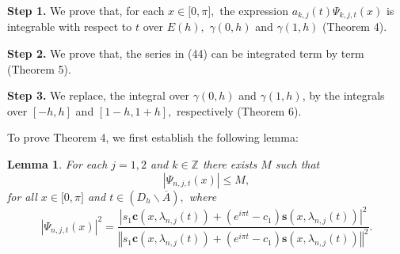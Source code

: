 \documentclass{article}%
\newtheorem{lemma}{Lemma}
{}
\begin{document}
\textbf{Step 1. }We prove that, for each $x\in\lbrack0,\pi],$ the expression
$a_{k,j}(t)\Psi_{k,j,t}(x)$ is integrable with respect to $t$ over $E(h),$
$\gamma(0,h)$ and $\gamma(1,h)$ (Theorem 4).

\textbf{Step 2. }We prove that, the series in (44) can be integrated term by
term (Theorem 5).

\textbf{Step 3. }We replace, the integral over $\gamma(0,h)$ and $\gamma
(1,h)$, by the integrals over $[-h,h]$ and $[1-h,1+h],$ respectively (Theorem 6).

To prove Theorem 4, we first establish the following lemma:

\begin{lemma}
For each $j=1,2$ and $k\in\mathbb{Z}$ there exists $M$ such that
\begin{equation}
\left\vert \Psi_{n,j,t}(x)\right\vert \leq M, \tag{45}%
\end{equation}
for all $x\in\lbrack0,\pi]$ and $t\in\left(  D_{h}\backslash\overline
{A}\right)  ,$ where
\begin{equation}
\left\vert \Psi_{n,j,t}(x)\right\vert ^{2}=\frac{\left\vert s_{1}%
\mathbf{c}(x,\lambda_{n,j}(t))+\left(  e^{i\pi t}-c_{1}\right)  \mathbf{s}%
(x,\lambda_{n,j}(t))\right\vert ^{2}}{\left\Vert s_{1}\mathbf{c}%
(x,\lambda_{n,j}(t))+\left(  e^{i\pi t}-c_{1}\right)  \mathbf{s}%
(x,\lambda_{n,j}(t))\right\Vert ^{2}}. \tag{46}%
\end{equation}

\end{lemma}
\end{document}

